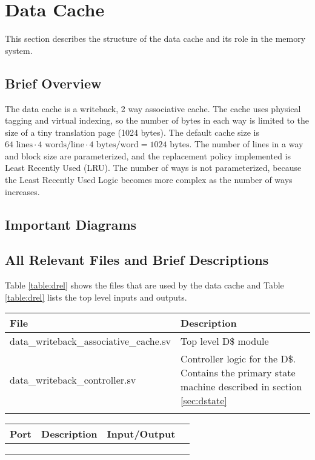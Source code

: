 \section{Data Cache}
This section describes the structure of the data cache and its role in the memory system.

\subsection{Brief Overview}

The data cache is a writeback, 2 way associative cache. 
The cache uses physical tagging and virtual indexing, so the number of bytes in each way is limited to the size of a tiny translation page (1024 bytes). 
The default cache size is $64 \text{ lines} \cdot 4 \text{ words/line} \cdot 4 \text{ bytes/word} = 1024 \text{ bytes}$. 
The number of lines in a way and block size are parameterized, and the replacement policy implemented is Least Recently Used (LRU).
The number of ways is not parameterized, because the Least Recently Used Logic becomes more complex as the number of ways increases.

\subsection{Important Diagrams}



\subsection{All Relevant Files and Brief Descriptions}

Table \ref{table:drel} shows the files that are used by the data cache and Table \ref{table:drel} lists the top level inputs and outputs.

\begin{tabular}{|l|p{80mm}|}
\hline File  & Description \\ 
\hline  data\_writeback\_associative\_cache.sv & Top level D\$ module \\ 
\hline  data\_writeback\_controller.sv & Controller logic for the D\$.
Contains the primary state machine described in section \ref{sec:dstate}\\ 
\hline 
\label{table:drel}
\end{tabular} 

\begin{tabular}{|l|l|l|l|}
\hline Port & Description & Input/Output \\ 
\hline  &  &  &  \\ 
\hline  &  &  &  \\ 
\hline 
\label{table:dio}
\end{tabular} 

